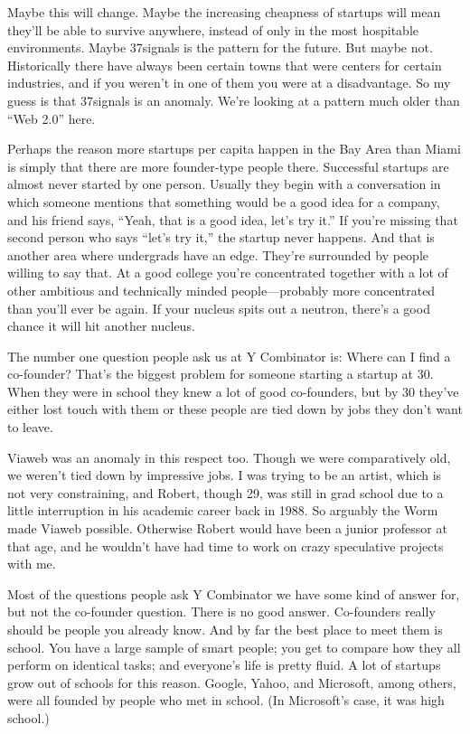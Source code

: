 \documentclass[12pt]{book}
\begin{document}
Maybe this will change. Maybe the increasing cheapness of startups will
mean they'll be able to survive anywhere, instead of only in the most
hospitable environments. Maybe 37signals is the pattern for the future.
But maybe not. Historically there have always been certain towns that
were centers for certain industries, and if you weren't in one of them
you were at a disadvantage. So my guess is that 37signals is an anomaly.
We're looking at a pattern much older than ``Web 2.0'' here.

Perhaps the reason more startups per capita happen in the Bay Area than
Miami is simply that there are more founder-type people there.
Successful startups are almost never started by one person. Usually they
begin with a conversation in which someone mentions that something would
be a good idea for a company, and his friend says, ``Yeah, that is a
good idea, let's try it.'' If you're missing that second person who says
``let's try it,'' the startup never happens. And that is another area
where undergrads have an edge. They're surrounded by people willing to
say that. At a good college you're concentrated together with a lot of
other ambitious and technically minded people---probably more
concentrated than you'll ever be again. If your nucleus spits out a
neutron, there's a good chance it will hit another nucleus.

The number one question people ask us at Y Combinator is: Where can I
find a co-founder? That's the biggest problem for someone starting a
startup at 30. When they were in school they knew a lot of good
co-founders, but by 30 they've either lost touch with them or these
people are tied down by jobs they don't want to leave.

Viaweb was an anomaly in this respect too. Though we were comparatively
old, we weren't tied down by impressive jobs. I was trying to be an
artist, which is not very constraining, and Robert, though 29, was still
in grad school due to a little interruption in his academic career back
in 1988. So arguably the Worm made Viaweb possible. Otherwise Robert
would have been a junior professor at that age, and he wouldn't have had
time to work on crazy speculative projects with me.

Most of the questions people ask Y Combinator we have some kind of
answer for, but not the co-founder question. There is no good answer.
Co-founders really should be people you already know. And by far the
best place to meet them is school. You have a large sample of smart
people; you get to compare how they all perform on identical tasks; and
everyone's life is pretty fluid. A lot of startups grow out of schools
for this reason. Google, Yahoo, and Microsoft, among others, were all
founded by people who met in school. (In Microsoft's case, it was high
school.)
\end{document}
